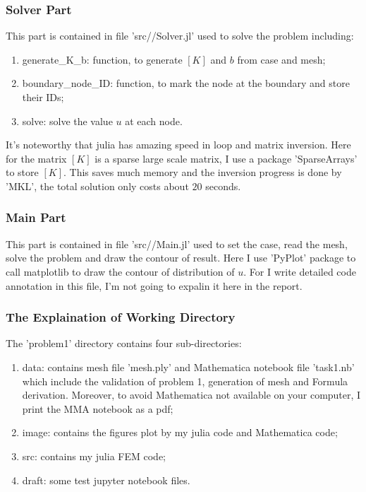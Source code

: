\subsubsection{Solver Part}

This part is contained in file 'src//Solver.jl' used to solve the problem including:
\begin{enumerate}
    \item generate\_K\_b: function, to generate $[K]$ and $b$ from case and mesh;
    \item boundary\_node\_ID: function, to mark the node at the boundary and store their IDs;
    \item solve: solve the value $u$ at each node.
\end{enumerate}

It's noteworthy that julia has amazing speed in loop and matrix inversion. 
Here for the matrix $[K]$ is a sparse large scale matrix, 
I use a package 'SparseArrays' to store $[K]$. 
This saves much memory and the inversion progress is done by 'MKL', 
the total solution only costs about $20$ seconds.

\subsubsection{Main Part}

This part is contained in file 'src//Main.jl' used to set the case, read the mesh, 
solve the problem and draw the contour of result. 
Here I use 'PyPlot' package to call matplotlib to draw the contour of distribution of $u$. 
For I write detailed code annotation in this file, I'm not going to expalin it here in the report.

\subsubsection{The Explaination of Working Directory}

The 'problem1' directory contains four sub-directories:
\begin{enumerate}
    \item data: contains mesh file 'mesh.ply' and Mathematica notebook file 'task1.nb' which include the validation of problem 1, generation of mesh and Formula derivation. Moreover, to avoid Mathematica not available on your computer, I print the MMA notebook as a pdf;
    \item image: contains the figures plot by my julia code and Mathematica code;
    \item src: contains my julia FEM code;
    \item draft: some test jupyter notebook files.
\end{enumerate}

